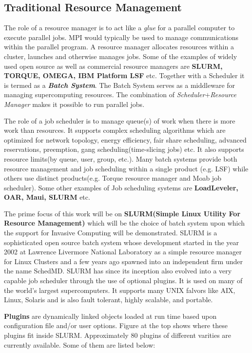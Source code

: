 \documentclass{acm_proc_article-sp}
\begin{document}
\subsection{Traditional Resource Management}
The role of a resource manager is to act like a \textit{glue} for a parallel computer to execute parallel jobs. MPI would typically be used to manage communications within the parallel program. A resource manager allocates resources within a cluster, launches and otherwise manages jobs. Some of the examples of widely used open source as well as commercial resource managers are \textbf{SLURM, TORQUE, OMEGA, IBM Platform LSF} etc. Together with a Scheduler it is termed as a \textbf{\textit{Batch System}}. The Batch System serves as a middleware for managing supercomputing resources. The combination of \textit{Scheduler}$+$\textit{Resource Manager} makes it possible to run parallel jobs.\par
\noindent
The role of a job scheduler is to manage queue(s) of work when there is more work than resources. It supports complex scheduling algorithms which are optimized for network topology, energy efficiency, fair share scheduling, advanced reservations, preemption, gang scheduling(time-slicing jobs) etc. It also supports resource limits(by queue, user, group, etc.). Many batch systems provide both resource management and job scheduling within a single product (e.g. LSF) while others use distinct products(e.g. Torque resource manager and Moab job scheduler). Some other examples of Job scheduling systems are \textbf{LoadLeveler, OAR, Maui, SLURM} etc.\par
\noindent
The prime focus of this work will be on \textbf{SLURM(Simple Linux Utility For Resource Management)} which will be the choice of batch system upon which the support for Invasive Computing will be demonstrated. SLURM is a sophisticated open source batch system whose development started in the year 2002 at Lawrence Livermore National Laboratory as a simple resource manager for Linux Clusters and a few years ago spawned into an independent firm under the name SchedMD. SLURM has since its inception also evolved into a very capable job scheduler through the use of optional plugins. It is used on many of the world's largest supercomputers. It supports many UNIX falvors like AIX, Linux, Solaris and is also fault tolerant, highly scalable, and portable.\par
\textbf{Plugins} are dynamically linked objects loaded at run time based upon configuration file and/or user options. Figure at the top shows where these plugins fit inside SLURM. Approximately $80$ plugins of different varities are currently available. Some of them are listed below:
\end{document}
